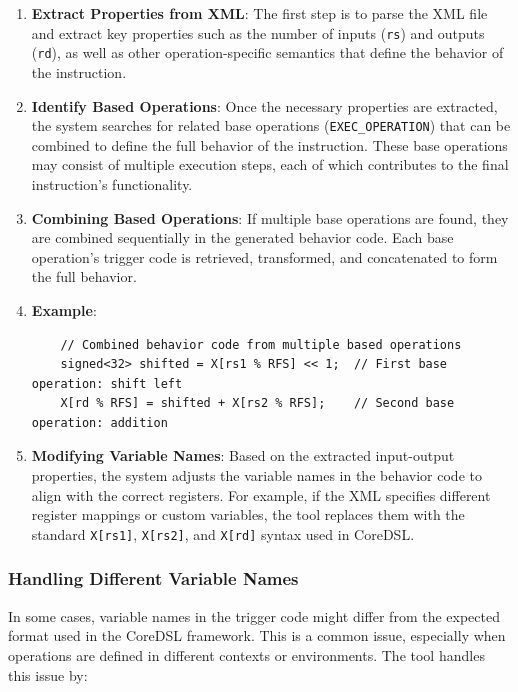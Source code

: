 \begin{enumerate}
    \item \textbf{Extract Properties from XML}: The first step is to parse the XML file and extract key properties such as the number of inputs (\texttt{rs}) and outputs (\texttt{rd}), as well as other operation-specific semantics that define the behavior of the instruction.

    \item \textbf{Identify Based Operations}: Once the necessary properties are extracted, the system searches for related base operations (\texttt{EXEC\_OPERATION}) that can be combined to define the full behavior of the instruction. These base operations may consist of multiple execution steps, each of which contributes to the final instruction's functionality.

    \item \textbf{Combining Based Operations}: If multiple base operations are found, they are combined sequentially in the generated behavior code. Each base operation's trigger code is retrieved, transformed, and concatenated to form the full behavior.

    \item \textbf{Example}:
    \begin{lstlisting}
    // Combined behavior code from multiple based operations
    signed<32> shifted = X[rs1 % RFS] << 1;  // First base operation: shift left
    X[rd % RFS] = shifted + X[rs2 % RFS];    // Second base operation: addition
    \end{lstlisting}

    \item \textbf{Modifying Variable Names}: Based on the extracted input-output properties, the system adjusts the variable names in the behavior code to align with the correct registers. For example, if the XML specifies different register mappings or custom variables, the tool replaces them with the standard \texttt{X[rs1]}, \texttt{X[rs2]}, and \texttt{X[rd]} syntax used in CoreDSL.
\end{enumerate}

\subsubsection{Handling Different Variable Names}

In some cases, variable names in the trigger code might differ from the expected format used in the CoreDSL framework. This is a common issue, especially when operations are defined in different contexts or environments. The tool handles this issue by:


